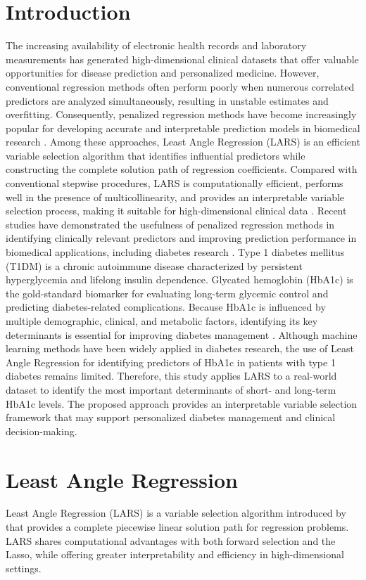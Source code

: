 \documentclass[twoside]{article}
\begin{document}
\section{Introduction}
The increasing availability of electronic health records and laboratory measurements has generated high-dimensional clinical datasets that offer valuable opportunities for disease prediction and personalized medicine. However, conventional regression methods often perform poorly when numerous correlated predictors are analyzed simultaneously, resulting in unstable estimates and overfitting. Consequently, penalized regression methods have become increasingly popular for developing accurate and interpretable prediction models in biomedical research \cite{James2021,Desai2024}. Among these approaches, Least Angle Regression (LARS) is an efficient variable selection algorithm that identifies influential predictors while constructing the complete solution path of regression coefficients. Compared with conventional stepwise procedures, LARS is computationally efficient, performs well in the presence of multicollinearity, and provides an interpretable variable selection process, making it suitable for high-dimensional clinical data \cite{Efron2004}. Recent studies have demonstrated the usefulness of penalized regression methods in identifying clinically relevant predictors and improving prediction performance in biomedical applications, including diabetes research \cite{Derici2021,Casacchia2024}. Type 1 diabetes mellitus (T1DM) is a chronic autoimmune disease characterized by persistent hyperglycemia and lifelong insulin dependence. Glycated hemoglobin (HbA1c) is the gold-standard biomarker for evaluating long-term glycemic control and predicting diabetes-related complications. Because HbA1c is influenced by multiple demographic, clinical, and metabolic factors, identifying its key determinants is essential for improving diabetes management \cite{ADA_Standards_2024:2024,Rask-Madsen:2013,Schiborn2022}. Although machine learning methods have been widely applied in diabetes research, the use of Least Angle Regression for identifying predictors of HbA1c in patients with type 1 diabetes remains limited. Therefore, this study applies LARS to a real-world dataset to identify the most important determinants of short- and long-term HbA1c levels. The proposed approach provides an interpretable variable selection framework that may support personalized diabetes management and clinical decision-making.
\section{Least Angle Regression}
Least Angle Regression (LARS) is a variable selection algorithm introduced by \cite{Efron2004} that provides a complete piecewise linear solution path for regression problems. LARS shares computational advantages with both forward selection and the Lasso, while offering greater interpretability and efficiency in high-dimensional settings.
\end{document}
